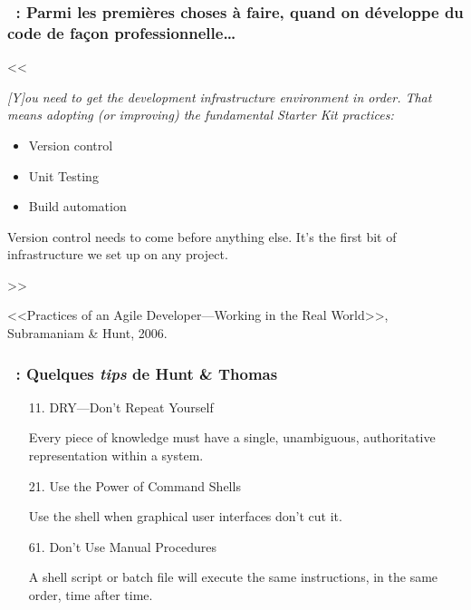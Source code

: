 \begin{frame}
\frametitle{~: Parmi les premi\`eres choses \`a faire, quand on
d\'eveloppe du code de fa\c{c}on professionnelle\ldots}

<<{\em [Y]ou need to get the development infrastructure environment in
order.  That means adopting (or improving) the fundamental Starter Kit
practices:
\begin{itemize}
\item {Version control}

\item {Unit Testing}

\item \alert{Build automation}
\end{itemize}

{Version control} needs to come before anything else. It's the first
bit of infrastructure we set up on any project.}>>

\bigskip


{\small<<Practices of an Agile Developer---Working in the Real
World>>, Subramaniam \& Hunt, 2006.}


\NOTE{\ }

\end{frame}

\begin{frame}
\frametitle{~: Quelques \emph{tips} de Hunt \& Thomas}

\begin{itemize}

\item[11.] \alert{DRY---Don't Repeat Yourself}

Every piece of knowledge must have a single, unambiguous,
authoritative representation within a system.

\vfill

\item[21.] \alert{Use the Power of Command Shells}

Use the shell when graphical user interfaces don’t cut it.

\vfill
\item[61.] \alert{Don't Use Manual Procedures}

A shell script or batch file will execute the same instructions, in
the same order, time after time.

\VF

\end{itemize}

\NOTEvide


\end{frame}


